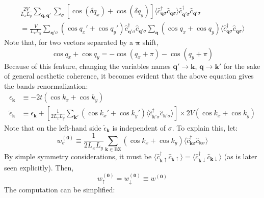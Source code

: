 \begin{multline}
	\frac{2V}{L_x L_y} \sum_{\mathbf{q}, \mathbf{q}'} \sum_\sigma \left[
		\cos \left( \delta q_x \right) + \cos \left( \delta q_y \right)	
	\right] \langle
		\hat c_{\mathbf{q}\sigma}^\dagger  \hat c_{\mathbf{q}\sigma}
	\rangle
	\hat c_{\mathbf{q}'\sigma}^\dagger  \hat c_{\mathbf{q}'\sigma} \\
	= \frac{V}{L_x L_y} \sum_{\mathbf{q}'\sigma} \left(
		\cos q_x' + \cos q_y'
	\right) \hat c_{\mathbf{q}'\sigma}^\dagger  \hat c_{\mathbf{q}'\sigma} \sum_\mathbf{q} \left(
		\cos q_x + \cos q_y
	\right) \langle
		\hat c_{\mathbf{q}\sigma}^\dagger  \hat c_{\mathbf{q}\sigma}
	\rangle
	\label{eq:reciprocal-space-non-local-interaction-fock-dd-intermediate-2}
\end{multline}
Note that, for two vectors separated by a $\bm{\pi}$ shift,
\[
	\cos q_x + \cos q_y = - \cos \left( q_x+\pi \right) - \cos \left( q_y+\pi \right)
\]
Because of this feature, changing the variables names $\mathbf{q}'\to\mathbf{k}$, $\mathbf{q}\to\mathbf{k}'$ for the sake of general aesthetic coherence, it becomes evident that the above equation gives the bands renormalization:
\[
\begin{aligned}
	\epsilon_\mathbf{k} &\equiv -2t \left(
		\cos k_x + \cos k_y
	\right) \\
	\tilde{\epsilon}_\mathbf{k} &\equiv \epsilon_\mathbf{k} + 
	\left[
		\frac{1}{2L_xL_y} \sum_{\mathbf{k}'} \left(
			\cos k_x' + \cos k_y'
		\right) \langle
		\hat c_{\mathbf{k}'\sigma}^\dagger  \hat c_{\mathbf{k}'\sigma}
		\rangle
	\right] \times 2V \left(
		\cos k_x + \cos k_y
	\right)
\end{aligned}
\]
Note that on the left-hand side $\tilde{\epsilon}_\mathbf{k}$ is independent of $\sigma$. To explain this, let:
\[
	w_\sigma^{(\mathbf{0})} \equiv \frac{1}{2L_xL_y} \sum_{\mathbf{k}\in\mathrm{BZ}} \left(
		\cos k_x + \cos k_y
	\right) \langle
	\hat c_{\mathbf{k}\sigma}^\dagger  \hat c_{\mathbf{k}\sigma}
	\rangle
\]
By simple symmetry considerations, it must be $\langle \hat c_{\mathbf{k}\uparrow}^\dagger  \hat c_{\mathbf{k}\uparrow} \rangle = \langle \hat c_{\mathbf{k}\downarrow}^\dagger  \hat c_{\mathbf{k}\downarrow} \rangle$ (as is later seen explicitly). Then,
\[
	w_\uparrow^{(\mathbf{0})} = w_\downarrow^{(\mathbf{0})} \equiv w^{(\mathbf{0})}
\]
The computation can be simplified:
